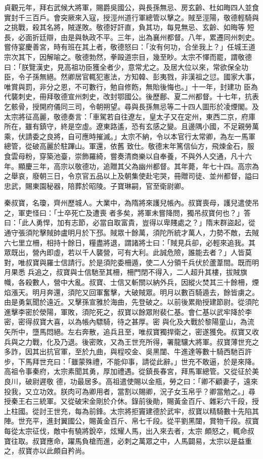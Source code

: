 \begin{pinyinscope}
 貞觀元年，拜右武候大將軍，賜爵吳國公，與長孫無忌、房玄齡、杜如晦四人並食實封千三百戶。會突厥來入寇，授涇州道行軍總管以擊之。賊至涇陽，敬德輕騎與之挑戰，殺其名將，賊遂敗。敬德好訐直，負其功，每見無忌、玄齡、如晦等
 短長，必面折廷辯，由是與執政不平。三年，出為襄州都督。八年，累遷同州刺史。嘗侍宴慶善宮，時有班在其上者，敬德怒曰：「汝有何功，合坐我上？」任城王道宗次其下，因解喻之。敬德勃然，拳毆道宗目，幾至眇。太宗不懌而罷，謂敬德曰：「朕覽漢史，見高祖功臣獲全者少，意常尤之。及居大位以來，常欲保全功臣，令子孫無絕。然卿居官輒犯憲法，方知韓、彭夷戮，非漢祖之愆。國家大事，唯賞與罰，非分之恩，不可數行，勉自修飭，無貽後悔也。」十一年，封建功
 臣為代襲刺史，冊拜敬德宣州刺史，改封鄂國公。後歷鄜、夏二州都督。十七年，抗表乞骸骨，授開府儀同三司，令朝朔望。尋與長孫無忌等二十四人圖形於凌煙閣。及太宗將征高麗，敬德奏言：「車駕若自往遼左，皇太子又在定州，東西二京，府庫所在，雖有鎮守，終是空虛。遼東路遙，恐有玄感之變。且邊隅小國，不足親勞萬乘，伏請委之良將，自可應時摧滅。」太宗不納，令以本官行太常卿，為左一馬軍總管，從破高麗於駐蹕山。軍還，依舊
 致仕。敬德末年篤信仙方，飛煉金石，服食雲母粉，穿築池臺，崇飾羅綺，嘗奏清商樂以自奉養，不與外人交通，凡十六年。顯慶三年，高宗以敬德功，追贈其父為幽州都督。其年薨，年七十四。高宗為之舉哀，廢朝三日，令京官五品以上及朝集使赴宅哭，冊贈司徒、並州都督，謚曰忠武，賜東園秘器，陪葬於昭陵。子寶琳嗣，官至衛尉卿。



 秦叔寶，名瓊，齊州歷城人。大業中，為隋將來護兒帳內。叔寶喪母，護兒遣使吊之，軍吏怪曰：「士卒死亡及遭喪
 者多矣，將軍未嘗降問，獨吊叔寶何也？」答曰：「此人勇悍，加有志節，必當自取富貴，豈得以卑賤處之？」隋末群盜起，從通守張須陀擊賊帥盧明月於下邳。賊眾十餘萬，須陀所統才萬人，力勢不敵，去賊六七里立柵，相持十餘日，糧盡將退，謂諸將士曰：「賊見兵卻，必輕來追我。其眾既出，營內即虛，若以千人襲營，可有大利。此誠危險，誰能去者？」人皆莫對，唯叔寶與羅士信請行。於是須陀委柵遁，使二人分領千兵伏於蘆葦間。既而明月果悉
 兵追之，叔寶與士信馳至其柵，柵門閉不得入，二人超升其樓，拔賊旗幟，各殺數人，營中大亂。叔寶、士信又斬關以納外兵，因縱火焚其三十餘柵，煙焰漲天。明月奔還，須陀又回軍奮擊，大破賊眾。明月以數百騎遁去，餘皆虜之。由是勇氣聞於遠近。又擊孫宣雅於海曲，先登破之。以前後累勛授建節尉。從須陀進擊李密於滎陽，軍敗，須陀死之，叔寶以餘眾附裴仁基。會仁基以武牢降於李密，密得叔寶大喜，以為帳內驃騎，待之甚厚。密
 與化及大戰於黎陽童山，為流矢所中，墮馬悶絕。左右奔散，追兵且至，唯叔寶獨捍衛之，密遂獲免。叔寶又收兵與之力戰，化及乃退。後密敗，又為王世充所得，署龍驤大將軍。叔寶薄世充之多詐，因其出抗官軍，至於九曲，與程咬金、吳黑闥、牛進達等數十騎西馳百許步，下馬拜世充曰：「雖蒙殊禮，不能仰事，請從此辭。」世充不敢逼，於是來降。高祖令事秦府，太宗素聞其勇，厚加禮遇。從鎮長春宮，拜馬軍總管。又從征於美良川，破尉遲敬
 德，功最居多。高祖遣使賜以金瓶，勞之曰：「卿不顧妻子，遠來投我，又立功效。朕肉可為卿用者，當割以賜卿，況子女玉帛乎？卿當勉之。」尋授秦王右三統軍。又從破宋金剛於介休。錄前後勛，賜黃金百斤、雜彩六千段，授上柱國。從討王世充，每為前鋒。太宗將拒竇建德於武牢，叔寶以精騎數十先陷其陣。世充平，進封翼國公，賜黃金百斤、帛七千段。從平劉黑闥，賞物千段。叔寶每從太宗征伐，敵中有驍將銳卒，炫耀人馬，出入來去者，太宗
 頗怒之，輒命叔寶往取。叔寶應命，躍馬負槍而進，必刺之萬眾之中，人馬闢易，太宗以是益重之，叔寶亦以此頗自矜尚。




\end{pinyinscope}
